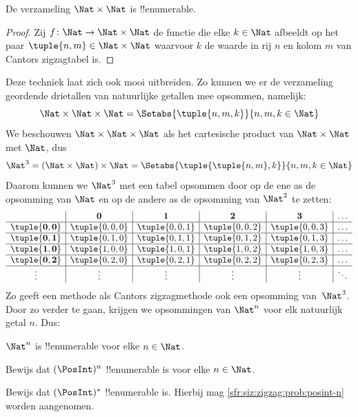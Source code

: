 \documentclass[../../../include/open-logic-section]{subfiles}
\begin{document}
\begin{prop}
De verzameling $\Nat \times \Nat$ is !!{enumerable}.
\end{prop}

\begin{proof}
Zij $f \colon \Nat \to \Nat\times\Nat$ de functie die elke $k \in \Nat$
afbeeldt op het paar $\tuple{n,m} \in \Nat \times \Nat$ waarvoor $k$ de
waarde in rij $n$ en kolom $m$ van Cantors zigzagtabel is. 
\end{proof}

\begin{explain}
Deze techniek laat zich ook mooi uitbreiden. Zo kunnen we er de verzameling
geordende drietallen van natuurlijke getallen mee opsommen, namelijk:
\[
\Nat \times \Nat \times \Nat = \Setabs{\tuple{n,m,k}}{n,m,k \in \Nat}
\]
We beschouwen $\Nat \times \Nat \times \Nat$ als het cartesische product van
$\Nat \times \Nat$ met $\Nat$, dus
\[
\Nat^3 = (\Nat \times \Nat) \times \Nat =
\Setabs{\tuple{\tuple{n,m},k}}{n, m, k
  \in \Nat }
\]
Daarom kunnen we $\Nat^3$ met een tabel opsommen door op de ene as de
opsomming van $\Nat$ en op de andere as de opsomming van $\Nat^2$ te zetten:
\[
\begin{array}{ c | c | c | c | c | c}
& \mathbf 0 & \mathbf 1 & \mathbf 2 & \mathbf 3 & \dots \\
\hline
\mathbf{\tuple{0,0}} & \tuple{0,0,0} & \tuple{0,0,1} & \tuple{0,0,2} & \tuple{0,0,3} & \dots \\
\hline
\mathbf{\tuple{0,1}} & \tuple{0,1,0} & \tuple{0,1,1} & \tuple{0,1,2} & \tuple{0,1,3} & \dots \\
\hline
\mathbf{\tuple{1,0}} & \tuple{1,0,0} & \tuple{1,0,1} & \tuple{1,0,2} & \tuple{1,0,3} & \dots \\
\hline
\mathbf{\tuple{0,2}} & \tuple{0,2,0} & \tuple{0,2,1} & \tuple{0,2,2} & \tuple{0,2,3} & \dots\\
\hline
\vdots & \vdots & \vdots & \vdots & \vdots & \ddots \\
\end{array}
\]
Zo geeft een methode als Cantors zigzagmethode ook een opsomming van~$\Nat^3$.
Door zo verder te gaan, krijgen we opsommingen van $\Nat^n$ voor elk natuurlijk
getal $n$. Dus:
\end{explain}

\begin{prop}
$\Nat^n$ is !!{enumerable} voor elke $n \in \Nat$.
\end{prop}

\begin{prob}\label{sfr:siz:zigzag:prob:posint-n}
Bewijs dat $(\PosInt)^n$ !!{enumerable} is voor elke $n \in \Nat$.
\end{prob}

\begin{prob}\label{sfr:siz:zigzag:prob:posint-star}
  Bewijs dat $(\PosInt)^*$ !!{enumerable} is. Hierbij mag
  \cref{sfr:siz:zigzag:prob:posint-n} worden aangenomen.
\end{prob}
\end{document}
